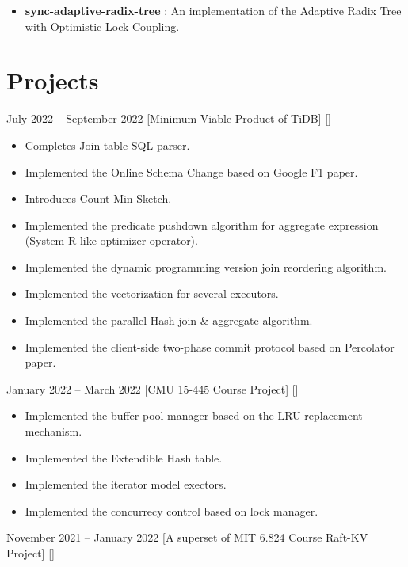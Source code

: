 \documentclass{wenycv}
\begin{document}
\begin{itemize}
  \item \textbf{sync-adaptive-radix-tree} :
  {\small An implementation of the Adaptive Radix Tree with Optimistic Lock Coupling.  }
\end{itemize}

\section{Projects}

  {July 2022 – September 2022}
  [Minimum Viable Product of TiDB]
  []
\begin{itemize}
  \item Completes Join table SQL parser.
  \item Implemented the Online Schema Change based on Google F1 paper.
  \item Introduces Count-Min Sketch.
  \item Implemented the predicate pushdown algorithm for aggregate expression (System-R like optimizer operator).
  \item Implemented the dynamic programming version join reordering algorithm.
  \item Implemented the vectorization for several executors.
  \item Implemented the parallel Hash join \& aggregate algorithm.
  \item Implemented the client-side two-phase commit protocol based on Percolator paper.
\end{itemize}

  {January 2022 – March 2022}
  [CMU 15-445 Course Project]
  []

\begin{itemize}
  \item Implemented the buffer pool manager based on the LRU replacement mechanism.
  \item Implemented the Extendible Hash table.
  \item Implemented the iterator model exectors.
  \item Implemented the concurrecy control based on lock manager.
\end{itemize}

  {November 2021 – January 2022}
  [A superset of MIT 6.824 Course Raft-KV Project]
  []
\end{document}
